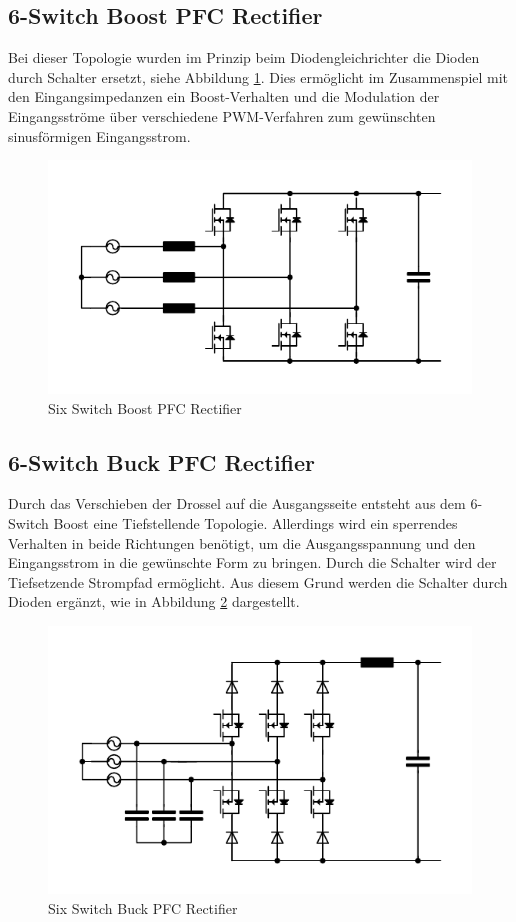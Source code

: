 	\subsection{6-Switch Boost PFC Rectifier}
				Bei dieser Topologie wurden im Prinzip beim Diodengleichrichter die Dioden durch Schalter ersetzt, siehe Abbildung \ref{fig:sixswitchboost}. Dies ermöglicht im Zusammenspiel mit den Eingangsimpedanzen ein Boost-Verhalten und die Modulation der Eingangsströme über verschiedene \gls{PWM}-Verfahren zum gewünschten sinusförmigen Eingangsstrom.
			\begin{figure} 
				\centering
				\includegraphics[width=1\linewidth]{content/Grafiken/SixSwitchBoost}
				\caption{Six Switch Boost PFC Rectifier}
				\label{fig:sixswitchboost}
			\end{figure}
	\subsection{6-Switch Buck PFC Rectifier}
		\label{sec:6switchBuck}
		Durch das Verschieben der Drossel auf die Ausgangsseite entsteht aus dem 6-Switch Boost eine Tiefstellende Topologie. Allerdings wird ein sperrendes Verhalten in beide Richtungen benötigt, um die Ausgangsspannung und den Eingangsstrom in die gewünschte Form zu bringen. Durch die Schalter wird der Tiefsetzende Strompfad ermöglicht. Aus diesem Grund werden die Schalter durch Dioden ergänzt, wie in Abbildung \ref{fig:sixswitchbuck} dargestellt.  
		\begin{figure}
			\centering
			\includegraphics[width=1\linewidth]{content/Grafiken/SixSwitchBuck}
			\caption{Six Switch Buck PFC Rectifier}
			\label{fig:sixswitchbuck}
		\end{figure}
		\pagebreak
